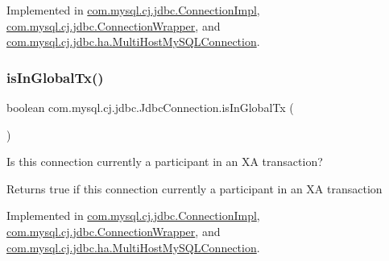 Implemented in \mbox{\hyperlink{classcom_1_1mysql_1_1cj_1_1jdbc_1_1_connection_impl_acc9cbd5c4e0570757e05993e123c5696}{com.\+mysql.\+cj.\+jdbc.\+Connection\+Impl}}, \mbox{\hyperlink{classcom_1_1mysql_1_1cj_1_1jdbc_1_1_connection_wrapper_a38b81e539492d555536e40cc39bca55b}{com.\+mysql.\+cj.\+jdbc.\+Connection\+Wrapper}}, and \mbox{\hyperlink{classcom_1_1mysql_1_1cj_1_1jdbc_1_1ha_1_1_multi_host_my_s_q_l_connection_a2eb48d606b888ae970ca17640c54b082}{com.\+mysql.\+cj.\+jdbc.\+ha.\+Multi\+Host\+My\+S\+Q\+L\+Connection}}.

\mbox{\label{interfacecom_1_1mysql_1_1cj_1_1jdbc_1_1_jdbc_connection_a919152df37a4bf60c12c0818256a90a3}} 
\subsubsection{\texorpdfstring{is\+In\+Global\+Tx()}{isInGlobalTx()}}
{\footnotesize\ttfamily boolean com.\+mysql.\+cj.\+jdbc.\+Jdbc\+Connection.\+is\+In\+Global\+Tx (\begin{DoxyParamCaption}{ }\end{DoxyParamCaption})}

Is this connection currently a participant in an XA transaction?

\begin{DoxyReturn}{Returns}
true if this connection currently a participant in an XA transaction 
\end{DoxyReturn}


Implemented in \mbox{\hyperlink{classcom_1_1mysql_1_1cj_1_1jdbc_1_1_connection_impl_a36d32f1c890a8774776f435a8d7a9f55}{com.\+mysql.\+cj.\+jdbc.\+Connection\+Impl}}, \mbox{\hyperlink{classcom_1_1mysql_1_1cj_1_1jdbc_1_1_connection_wrapper_a939c7730de2849e54b9b121adb1cdaa3}{com.\+mysql.\+cj.\+jdbc.\+Connection\+Wrapper}}, and \mbox{\hyperlink{classcom_1_1mysql_1_1cj_1_1jdbc_1_1ha_1_1_multi_host_my_s_q_l_connection_a12a895a23d45e4ac2df69fed6c022fef}{com.\+mysql.\+cj.\+jdbc.\+ha.\+Multi\+Host\+My\+S\+Q\+L\+Connection}}.

\mbox{\label{interfacecom_1_1mysql_1_1cj_1_1jdbc_1_1_jdbc_connection_a012dc133872dd4d6db6d6f98118d3251}} 
